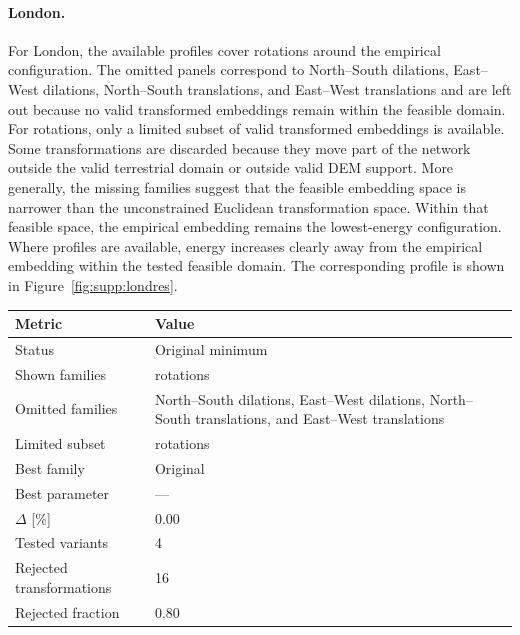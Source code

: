 \documentclass{article}
\begin{document}
\paragraph*{London.} For London, the available profiles cover rotations around the empirical configuration. The omitted panels correspond to North--South dilations, East--West dilations, North--South translations, and East--West translations and are left out because no valid transformed embeddings remain within the feasible domain. For rotations, only a limited subset of valid transformed embeddings is available. Some transformations are discarded because they move part of the network outside the valid terrestrial domain or outside valid DEM support. More generally, the missing families suggest that the feasible embedding space is narrower than the unconstrained Euclidean transformation space. Within that feasible space, the empirical embedding remains the lowest-energy configuration. Where profiles are available, energy increases clearly away from the empirical embedding within the tested feasible domain. The corresponding profile is shown in Figure~\ref{fig:supp:londres}.


\begin{center}
\begin{tabular}{p{}p{}}
\toprule
Metric & Value \\
\midrule
Status & Original minimum \\
Shown families & rotations \\
Omitted families & North--South dilations, East--West dilations, North--South translations, and East--West translations \\
Limited subset & rotations \\
Best family & Original \\
Best parameter & --- \\
$\Delta$ [\%] & 0.00 \\
Tested variants & 4 \\
Rejected transformations & 16 \\
Rejected fraction & 0.80 \\
\bottomrule
\end{tabular}
\end{center}
\end{document}
